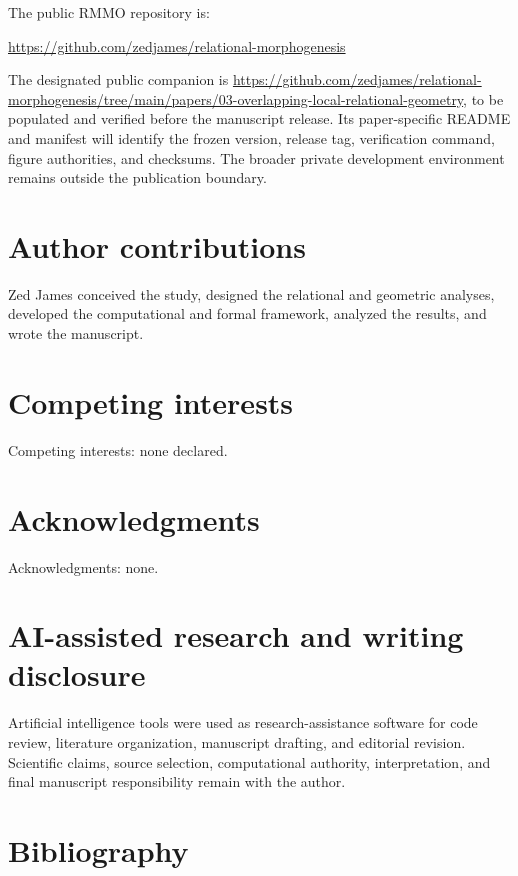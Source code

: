 \documentclass[11pt]{article}
\begin{document}
The public RMMO repository is:

\url{https://github.com/zedjames/relational-morphogenesis}

The designated public companion is \url{https://github.com/zedjames/relational-morphogenesis/tree/main/papers/03-overlapping-local-relational-geometry}, to be populated and verified before the manuscript release. Its paper-specific README and manifest will identify the frozen version, release tag, verification command, figure authorities, and checksums. The broader private development environment remains outside the publication boundary.

\section{Author contributions}

Zed James conceived the study, designed the relational and geometric analyses, developed the computational and formal framework, analyzed the results, and wrote the manuscript.

\section{Competing interests}

Competing interests: none declared.

\section{Acknowledgments}

Acknowledgments: none.

\section{AI-assisted research and writing disclosure}

Artificial intelligence tools were used as research-assistance software for code review, literature organization, manuscript drafting, and editorial revision. Scientific claims, source selection, computational authority, interpretation, and final manuscript responsibility remain with the author.

\section{Bibliography}
\end{document}
